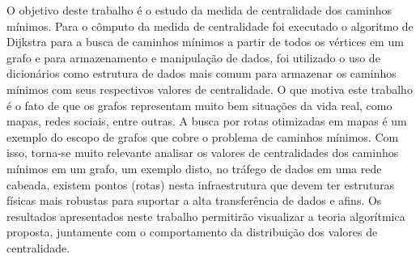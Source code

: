 \begin{resumo}
	O objetivo deste trabalho é o estudo da medida de centralidade dos caminhos mínimos. Para o cômputo da medida de centralidade foi executado o algoritmo de Dijkstra para a busca de caminhos mínimos a partir de todos os vértices em um grafo e para armazenamento e manipulação de dados, foi utilizado o uso de dicionários como estrutura de dados mais comum para armazenar os caminhos mínimos com seus respectivos valores de centralidade. O que motiva este trabalho é o fato de que os grafos representam muito bem situações da vida real, como mapas, redes sociais, entre outras. A busca por rotas otimizadas em mapas é um exemplo do escopo de grafos que cobre o problema de caminhos mínimos. Com isso, torna-se muito relevante analisar os valores de centralidades dos caminhos mínimos em um grafo, um exemplo disto, no tráfego de dados em uma rede cabeada, existem pontos (rotas) nesta infraestrutura que devem ter estruturas físicas mais robustas para suportar a alta transferência de dados e afins. Os resultados apresentados neste trabalho permitirão visualizar a teoria algorítmica proposta, juntamente com o comportamento da distribuição dos valores de centralidade. \newline \newline
\end{resumo}

